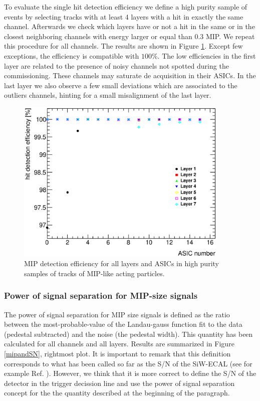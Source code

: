 \documentclass[a4paper,11pt]{article}
\begin{document}
To evaluate 
the single hit detection efficiency we define a high purity sample of
events by selecting
tracks with at least 4 layers with a hit in exactly the same channel. Afterwards we 
check which layers have or not a hit in the same or in the closest neighboring channels with energy larger or equal than 0.3 MIP.
We repeat this procedure for all channels.
The results are shown in Figure \ref{efficiency}. Except few exceptions, the efficiency is 
compatible with $100\%$.
The low efficiencies in the first layer are related to the presence of
noisy channels not spotted during the commissioning. These channels
may saturate de acquisition in their ASICs. In the last layer we also observe a few small deviations
which are associated to the outliers channels, hinting for a small misalignment of the last layer.

\begin{figure}[!t]
  \centering 
  \includegraphics[width=4in]{../figs/MIP/efficiency_nhits4_chips.eps}
  \caption{MIP detection efficiency for all layers and ASICs in high purity samples of tracks of MIP-like acting particles.}
\label{efficiency}
\end{figure}


\subsubsection{Power of signal separation for MIP-size signals}
\label{sec:sn}

The power of signal separation for MIP size signals is defined 
as the ratio between the most-probable-value of
the Landau-gauss function fit to the data (pedestal subtracted) and the noise (the pedestal width). This quantity 
has been calculated for all channels and all layers. 
Results are summarized in Figure \ref{mipandSN}, rightmost plot.
It is important to remark that this definition corresponds to what
has been called so far as the S/N of the SiW-ECAL (see for example Ref. \cite{Amjad:2014tha}).
However, we think that it is more correct to define the S/N of the detector
in the trigger decission line and use the power of signal separation concept
for the the quantity described at the beginning of the paragraph.
\end{document}
